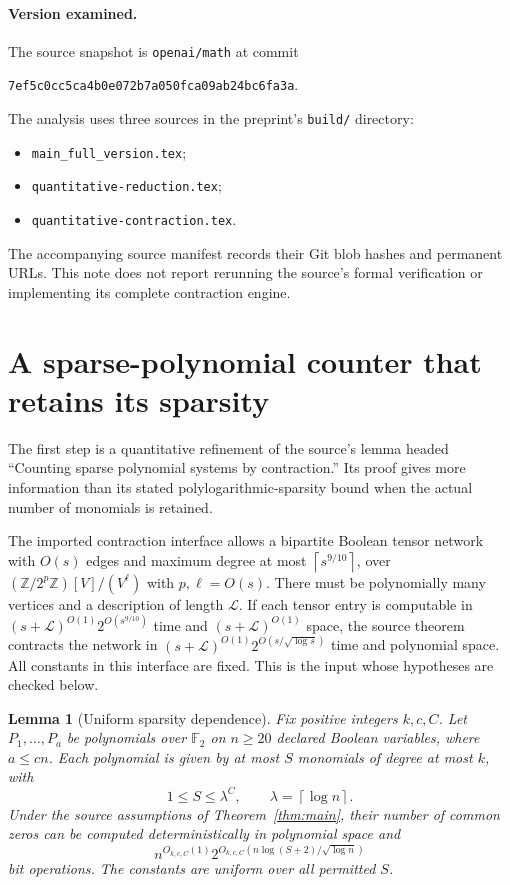 \documentclass[11pt]{article}
\numberwithin{equation}{section}
\newtheorem{lemma}[theorem]{Lemma}
\theoremstyle{definition}\newtheorem{definition}[theorem]{Definition}
\theoremstyle{remark}\newtheorem{remark}[theorem]{Remark}
\newcommand{\F}{\mathbb F}
\newcommand{\Z}{\mathbb Z}
\newcommand{\ceil}[1]{\left\lceil#1\right\rceil}
\begin{document}
\paragraph{Version examined.}
The source snapshot is \texttt{openai/math} at commit
\begin{center}
\small\texttt{7ef5c0cc5ca4b0e072b7a050fca09ab24bc6fa3a}.
\end{center}
The analysis uses three sources in the preprint's \texttt{build/} directory:
\begin{itemize}[nosep,leftmargin=*]
\item \texttt{main\_full\_version.tex};
\item \texttt{quantitative-reduction.tex};
\item \texttt{quantitative-contraction.tex}.
\end{itemize}
The accompanying source manifest records
their Git blob hashes and permanent URLs. This note does not report
rerunning the source's formal verification or implementing its complete
contraction engine.

\section{A sparse-polynomial counter that retains its sparsity}
\label{sec:sparse}

The first step is a quantitative refinement of the source's lemma
headed ``Counting sparse polynomial systems by contraction.'' Its
proof gives more information than its stated polylogarithmic-sparsity
bound when the actual number of monomials is retained.

The imported contraction interface allows a bipartite Boolean tensor
network with $O(s)$ edges and maximum degree at most $\ceil{s^{9/10}}$,
over $(\Z/2^p\Z)[V]/(V^\ell)$ with $p,\ell=O(s)$. There must be
polynomially many vertices and a description of length $\mathcal L$.
If each tensor entry is computable in
$(s+\mathcal L)^{O(1)}2^{O(s^{9/10})}$ time and
$(s+\mathcal L)^{O(1)}$ space, the source theorem contracts the network
in $(s+\mathcal L)^{O(1)}2^{O(s/\sqrt{\log s})}$ time and polynomial
space. All constants in this interface are fixed. This is the input
whose hypotheses are checked below.

\begin{lemma}[Uniform sparsity dependence]\label{lem:sparse}
Fix positive integers $k,c,C$. Let $P_1,\ldots,P_a$ be polynomials
over $\F_2$ on $n\ge20$ declared Boolean variables, where $a\le cn$.
Each polynomial is given by at most $S$ monomials of degree at most
$k$, with
\[
 1\le S\le\lambda^C,\qquad \lambda=\ceil{\log n}.
\]
Under the source assumptions of Theorem~\ref{thm:main}, their number
of common zeros can be computed deterministically in polynomial space
and
\begin{equation}\label{eq:sparse-time}
 n^{O_{k,c,C}(1)}
 2^{O_{k,c,C}(n\log(S+2)/\sqrt{\log n})}
\end{equation}
bit operations. The constants are uniform over all permitted $S$.
\end{lemma}
\end{document}
